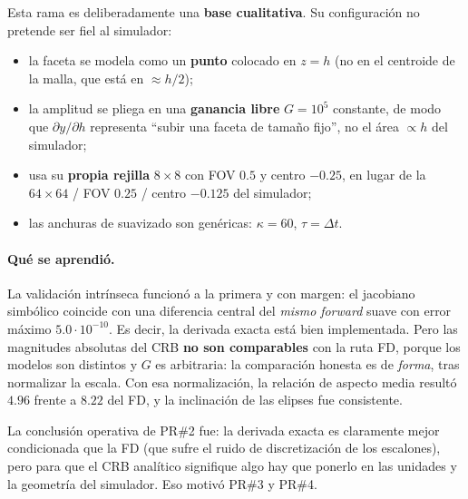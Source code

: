 \documentclass[11pt,a4paper]{article}
\theoremstyle{definition}
\begin{document}
Esta rama es deliberadamente una \textbf{base cualitativa}. Su configuración no
pretende ser fiel al simulador:
%
\begin{itemize}[leftmargin=*]
  \item la faceta se modela como un \textbf{punto} colocado en $z=h$ (no en el
        centroide de la malla, que está en $\approx h/2$);
  \item la amplitud se pliega en una \textbf{ganancia libre} $G=10^5$ constante,
        de modo que $\partial y/\partial h$ representa \enquote{subir una faceta de
        tamaño fijo}, no el área $\propto h$ del simulador;
  \item usa su \textbf{propia rejilla} $8\times8$ con FOV $0.5$ y centro
        $-0.25$, en lugar de la $64\times64$ / FOV $0.25$ / centro $-0.125$ del
        simulador;
  \item las anchuras de suavizado son genéricas: $\kappa=60$, $\tau=\Delta t$.
\end{itemize}

\paragraph{Qué se aprendió.}
La validación intrínseca funcionó a la primera y con margen: el jacobiano
simbólico coincide con una diferencia central del \emph{mismo} \emph{forward}
suave con error máximo $5.0\cdot10^{-10}$. Es decir, la derivada exacta está
bien implementada. Pero las magnitudes absolutas del CRB \textbf{no son
comparables} con la ruta FD, porque los modelos son distintos y $G$ es
arbitraria: la comparación honesta es de \emph{forma}, tras normalizar la
escala. Con esa normalización, la relación de aspecto media resultó $4.96$
frente a $8.22$ del FD, y la inclinación de las elipses fue consistente.

La conclusión operativa de PR\#2 fue: la derivada exacta es claramente mejor
condicionada que la FD (que sufre el ruido de discretización de los escalones),
pero para que el CRB analítico signifique algo hay que ponerlo en las unidades
y la geometría del simulador. Eso motivó PR\#3 y PR\#4.
\end{document}
